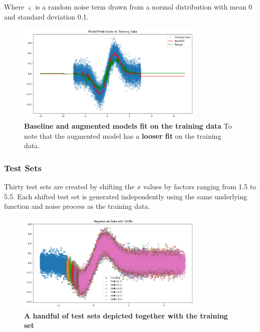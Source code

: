 Where $\varsigma$ is a random noise term drawn from a normal distribution with mean 0 and standard deviation 0.1.

\begin{figure}[H]
    \centering
    \includegraphics[width=0.8\textwidth]{assets/fit_on_train.png} 
    \caption{\textbf{Baseline and augmented models fit on the training data} To note that the augmented model has a \textbf{looser fit} on the training data.}
    \label{fig:fit-train}
\end{figure}

\subsubsection{Test Sets}
Thirty test sets are created by shifting the $x$ values by factors ranging from 1.5 to 5.5. Each shifted test set is generated independently using the same underlying function and noise process as the training data.
\begin{figure}[H]
    \centering
    \includegraphics[width=0.8\textwidth]{assets/reg_shift_plot.png} 
    \caption{\textbf{A handful of test sets depicted together with the training set}}
    \label{fig:reg-shift-plot}
\end{figure}

